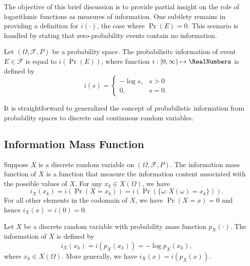 The objective of this brief discussion is to provide partial insight on the role of logarithmic functions as measures of information.
One subtlety remains in providing a definition for $i(\cdot)$, the case where $\Pr (E) = 0$.
This scenario is handled by stating that zero-probability events contain no information.

\begin{definition} \label{definition:ProbabilisticInformation}
Let $(\Omega, \mathcal{F}, P)$ be a probability space.
The probabilisitc information of event $E \in \mathcal{F}$ is equal to $i(\Pr(E))$, where function $i: [0, \infty) \mapsto \RealNumbers$ is defined by
\begin{equation} \label{equation:InformationFunction}
i(s) = \begin{cases} - \log s, & s > 0 \\
0, & s = 0 . \end{cases}
\end{equation}
\end{definition}

It is straightforward to generalized the concept of probabilistic information from probability spaces to discrete and continuous random variables.


\subsection{Information Mass Function}

Suppose $X$ is a discrete random variable on $(\Omega, \mathcal{F}, P)$.
The information mass function of $X$ is a function that measure the information content associated with the possible values of $X$.
For any $x_k \in X(\Omega)$, we have
\begin{equation*}
i_X (x_k) = i \left( \Pr (X = x_k) \right) = i \left( \Pr \left( \{ \omega : X(\omega) = x_k \} \right) \right) .
\end{equation*}
For all other elements in the codomain of $X$, we have $\Pr (X = x) = 0$ and hence $i_X (x) = i (0) = 0$.

\begin{definition}[IMF]
Let $X$ be a discrete random variable with probability mass function $p_X (\cdot)$.
The information of $X$ is defined by
\begin{equation*}
i_X (x_k) = i \left( p_X (x_k) \right) = - \log p_X (x_k),
\end{equation*}
where $x_k \in X(\Omega)$.
More generally, we have $i_X (x) = i \left( p_X (x) \right)$.
\end{definition}

